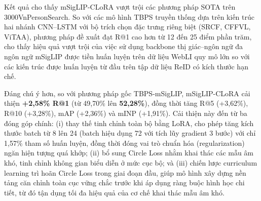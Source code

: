 \documentclass{jstarticle}
\begin{document}
\begin{table}[htp!]
\centering
\caption{So sánh với các phương pháp SOTA trên 3000VnPersonSearch. Kết quả tốt nhất được in \textbf{đậm}.}
\renewcommand{\arraystretch}{1.2}
\label{tab:offline-results}
\end{table}

Kết quả cho thấy mSigLIP-CLoRA vượt trội các phương pháp SOTA trên 3000VnPersonSearch. So với các mô hình TBPS truyền thống dựa trên kiến trúc hai nhánh CNN–LSTM với bộ trích chọn đặc trưng riêng biệt (SRCF, CFFVL, ViTAA), phương pháp đề xuất đạt R@1 cao hơn từ 12 đến 25 điểm phần trăm, cho thấy hiệu quả vượt trội của việc sử dụng backbone thị giác–ngôn ngữ đa ngôn ngữ mSigLIP được tiền huấn luyện trên dữ liệu WebLI quy mô lớn so với các kiến trúc được huấn luyện từ đầu trên tập dữ liệu ReID có kích thước hạn chế.

Đáng chú ý hơn, so với phương pháp gốc TBPS-mSigLIP, mSigLIP-CLoRA cải thiện \textbf{+2,58\% R@1} (từ 49,70\% lên \textbf{52,28\%}), đồng thời tăng R@5 (+3,62\%), R@10 (+3,28\%), mAP (+2,36\%) và mINP (+1,91\%). Cải thiện này đến từ ba đóng góp chính: (i) thay thế tinh chỉnh toàn bộ bằng LoRA, cho phép tăng kích thước batch từ 8 lên 24 (batch hiệu dụng 72 với tích lũy gradient 3 bước) với chỉ 1,57\% tham số huấn luyện, đồng thời đóng vai trò chuẩn hóa (regularization) ngăn hiện tượng quá khớp; (ii) bổ sung Circle Loss nhằm khai thác các mẫu âm khó, tinh chỉnh không gian biểu diễn ở mức cục bộ; và (iii) chiến lược curriculum learning trì hoãn Circle Loss trong giai đoạn đầu, giúp mô hình xây dựng nền tảng căn chỉnh toàn cục vững chắc trước khi áp dụng ràng buộc hình học chi tiết, từ đó tận dụng tối đa hiệu quả của cơ chế khai thác mẫu âm khó.
\end{document}
